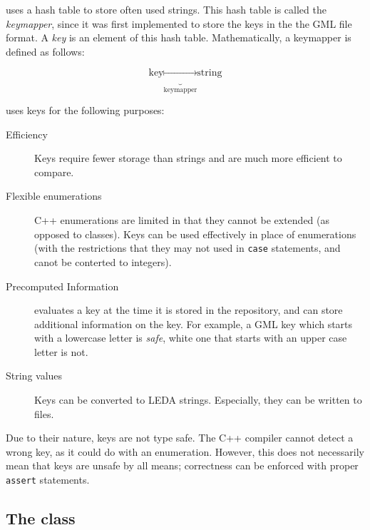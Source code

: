 \documentclass[twoside,fleqn]{report}
\begin{document}

\noindent \Graphlet{} uses a hash table to store often used strings.
This hash table is called the \emph{keymapper}, since it was
first implemented to store the keys in the the GML file
format. A \emph{key} is an element of this hash table.
Mathematically, a keymapper is defined as follows:

\[
  \mbox{key} \underbrace{\longmapsto}_{\mbox{keymapper}} \mbox{string}
\]


\noindent \Graphlet{} uses keys for the following purposes:

\begin{description}
  
  \item[Efficiency] Keys require fewer storage than strings and are 
  much more efficient to compare.
  
  \item[Flexible enumerations] C++ enumerations are limited in
  that they cannot be extended (as opposed to classes).  Keys can
  be used effectively in place of enumerations (with the
  restrictions that they may not used in \texttt{case}
  statements, and canot be conterted to integers).
  
  \item[Precomputed Information] \Graphlet{} evaluates a key at the 
  time it is stored in the repository, and can store additional 
  information on the key.  For example, a GML key which starts with 
  a lowercase letter is \emph{safe}, white one that starts with an 
  upper case letter is not.

  \item[String values] Keys can be converted to LEDA strings.
  Especially, they can be written to files.

\end{description}

\begin{notes}
  \item Due to their nature, keys are not type safe.  The C++
  compiler cannot detect a wrong key, as it could do with an
  enumeration.  However, this does not necessarily mean that keys
  are unsafe by all means; correctness can be enforced with
  proper \texttt{assert} statements.
\end{notes}

%
%

\subsection{The class }
\end{document}
